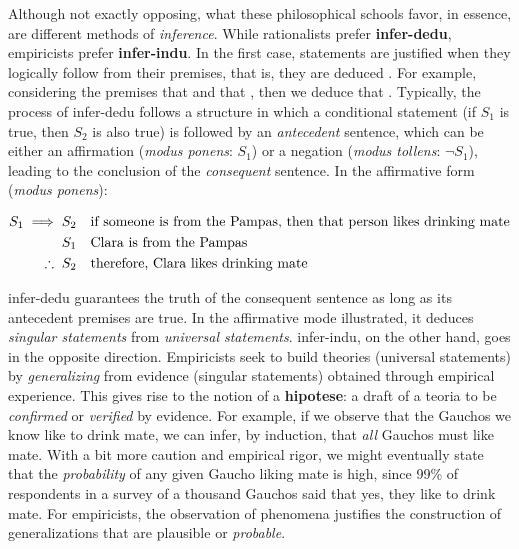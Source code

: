 \documentclass[./main_en.tex]{subfiles}
\begin{document}
\par Although not exactly opposing, what these philosophical schools favor, in essence, are different methods of \textit{inference}. While rationalists prefer \textbf{\gls{infer-dedu}}, empiricists prefer \textbf{\gls{infer-indu}}. In the first case, statements are justified when they logically follow from their premises, that is, they are deduced \cite{laird2010}. For example, considering the premises that  and that , then we deduce that . Typically, the process of \gls{infer-dedu} follows a structure in which a conditional statement (if $S_1$ is true, then $S_2$ is also true) is followed by an \textit{antecedent} sentence, which can be either an affirmation (\textit{modus ponens}: $S_1$) or a negation (\textit{modus tollens}: $\neg S_1$), leading to the conclusion of the \textit{consequent} sentence. In the affirmative form (\textit{modus ponens}):
\begin{linenomath*}
    \begin{align*}
        S_1 \implies S_2 & \quad \textnormal{if someone is from the Pampas, then that person likes drinking mate} \\
        S_1 & \quad \textnormal{Clara is from the Pampas}\\
        \therefore\;S_2 & \quad \textnormal{therefore, Clara likes drinking mate}
    \end{align*}
\end{linenomath*}
\gls{infer-dedu} guarantees the truth of the consequent sentence as long as its antecedent premises are true. In the affirmative mode illustrated, it deduces \textit{singular statements} from \textit{universal statements}. \gls{infer-indu}, on the other hand, goes in the opposite direction. Empiricists seek to build theories (universal statements) by \textit{generalizing} from evidence (singular statements) obtained through empirical experience. This gives rise to the notion of a \textbf{\gls{hipotese}}: a draft of a \gls{teoria} to be \textit{confirmed} or \textit{verified} by evidence. For example, if we observe that the Gauchos we know like to drink mate, we can infer, by induction, that \textit{all} Gauchos must like mate. With a bit more caution and empirical rigor, we might eventually state that the \textit{probability} of any given Gaucho liking mate is high, since 99\% of respondents in a survey of a thousand Gauchos said that yes, they like to drink mate. For empiricists, the observation of phenomena justifies the construction of generalizations that are plausible or \textit{probable}.
\end{document}
